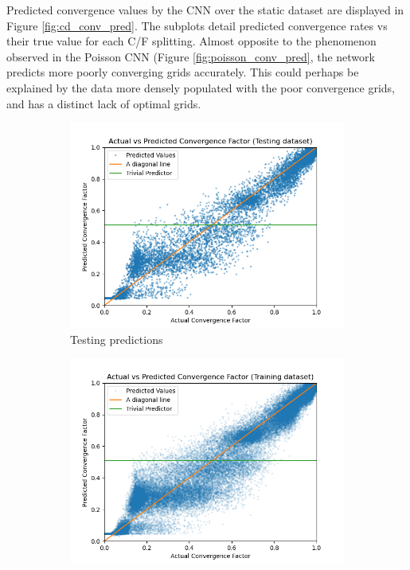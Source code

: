 \documentclass[review]{siamart190516}
\begin{document}
Predicted convergence values by the CNN over the static dataset are displayed in Figure \ref{fig:cd_conv_pred}.  The subplots detail predicted convergence rates vs their true value for each C/F splitting.  Almost opposite to the phenomenon observed in the Poisson CNN (Figure \ref{fig:poisson_conv_pred}, the network predicts more poorly converging grids accurately.  This could perhaps be explained by the data more densely populated with the poor convergence grids, and has a distinct lack of optimal grids.

\begin{figure}[h]
  \centering
  \begin{subfigure}{.48\textwidth}
    \includegraphics[width=\textwidth]{figs/cd_conv_test_pred.png}
    \caption{Testing predictions}
    \label{subfig:cd_conv_test}
  \end{subfigure}
  \begin{subfigure}{.48\textwidth}
    \includegraphics[width=\textwidth]{figs/cd_conv_train_pred.png}

\end{subfigure}
\end{figure}
\end{document}
